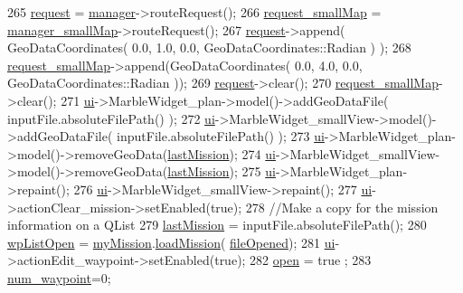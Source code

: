 \begin{DoxyCode}
265         \hyperlink{a00008_ade0ea03ae98566eaed4f7a1f331f237a}{request} = \hyperlink{a00008_a02d3f124c170b0126dab54f6e5a18dae}{manager}->routeRequest();
266         \hyperlink{a00008_aeae2fdde26f8ed9003c0cf66a1f25662}{request\_smallMap} = \hyperlink{a00008_aca10b4dc402bfe3d17f1fcba33544252}{manager\_smallMap}->routeRequest();
267         \hyperlink{a00008_ade0ea03ae98566eaed4f7a1f331f237a}{request}->append( GeoDataCoordinates( 0.0, 1.0, 0.0, GeoDataCoordinates::Radian ) );
268         \hyperlink{a00008_aeae2fdde26f8ed9003c0cf66a1f25662}{request\_smallMap}->append(GeoDataCoordinates( 0.0, 4.0, 0.0, 
      GeoDataCoordinates::Radian ));
269         \hyperlink{a00008_ade0ea03ae98566eaed4f7a1f331f237a}{request}->clear();
270         \hyperlink{a00008_aeae2fdde26f8ed9003c0cf66a1f25662}{request\_smallMap}->clear();
271         \hyperlink{a00008_a6dc041ef6a2ffb329928d2913e8344e6}{ui}->MarbleWidget\_plan->model()->addGeoDataFile( inputFile.absoluteFilePath() );
272         \hyperlink{a00008_a6dc041ef6a2ffb329928d2913e8344e6}{ui}->MarbleWidget\_smallView->model()->addGeoDataFile( inputFile.absoluteFilePath() );
273         \hyperlink{a00008_a6dc041ef6a2ffb329928d2913e8344e6}{ui}->MarbleWidget\_plan->model()->removeGeoData(\hyperlink{a00008_a3de39ae285a10e6655db42a1dd146c69}{lastMission});
274         \hyperlink{a00008_a6dc041ef6a2ffb329928d2913e8344e6}{ui}->MarbleWidget\_smallView->model()->removeGeoData(\hyperlink{a00008_a3de39ae285a10e6655db42a1dd146c69}{lastMission});
275         \hyperlink{a00008_a6dc041ef6a2ffb329928d2913e8344e6}{ui}->MarbleWidget\_plan->repaint();
276         \hyperlink{a00008_a6dc041ef6a2ffb329928d2913e8344e6}{ui}->MarbleWidget\_smallView->repaint();
277         \hyperlink{a00008_a6dc041ef6a2ffb329928d2913e8344e6}{ui}->actionClear\_mission->setEnabled(\textcolor{keyword}{true});
278         \textcolor{comment}{//Make a copy for the mission information on a QList}
279         \hyperlink{a00008_a3de39ae285a10e6655db42a1dd146c69}{lastMission} = inputFile.absoluteFilePath();
280         \hyperlink{a00008_a5d3a9439b166172c9c871c9a723eac19}{wpListOpen} = \hyperlink{a00008_a8bd377d858dd541faf8108389a13e5ed}{myMission}.\hyperlink{a00009_af307fc09e3c8e4303ff16324d681213a}{loadMission}(
      \hyperlink{a00008_ae55f476d1700ade204b3038b8c37f8ba}{fileOpened});
281         \hyperlink{a00008_a6dc041ef6a2ffb329928d2913e8344e6}{ui}->actionEdit\_waypoint->setEnabled(\textcolor{keyword}{true});
282         \hyperlink{a00008_a8c7e45250b1eb6821dd59fb2a9a016d7}{open} = true ;
283         \hyperlink{a00008_ab5b110200d9f08e5d10a2549f54073c9}{num\_waypoint}=0;

\end{DoxyCode}
